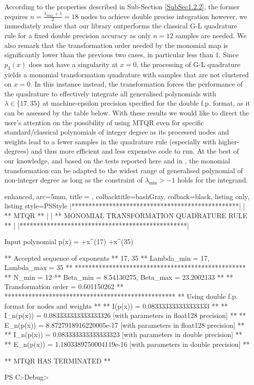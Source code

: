 \documentclass[a4paper, twosided]{book}
\begin{document}
\noindent
 According to the properties described in Sub-Section \ref{SubSec1.2.2}, the former requires $n=\frac{\lambda_{max}+1}{2}=18$ nodes to achieve double precise integration however, we immediately realise that our library outperforms the classical G-L quadrature rule for a fixed double precision accuracy as only $n=12$ samples are needed. We also remark  that the transformation order needed by the monomial map is significantly lower than the previous two cases, in particular less than $1$. Since $p_3(x)$ does not have a singularity at $x=0$, the processing of G-L quadrature yields a monomial transformation quadrature with samples that are not clustered on $x=0$. In this instance instead, the transformation forces the performance of the quadrature to effectively integrate all generalised polynomials with $\lambda\in\{17,35\}$ at machine-epsilon precision specified for the double f.p. format, as it can be assessed by the table below. With these results we would like to direct the user's attention on the possibility of using MTQR even for specific standard/classical polynomials of integer degree as its processed nodes and weights lead to a fewer samples in the quadrature rule (especially with higher-degrees) and thus more efficient and less expensive code to run. At the best of our knowledge, and based on the tests reported here and in \cite{Lombardi09, Lombardi21}, the monomial transformation can be adapted to the widest range of generalised polynomial of non-integer degree as long as the constraint of $\lambda_{\text{min}}>-1$ holds for the integrand.

\vspace{0.2cm}
\begin{tcblisting}{enhanced,
                   arc=5mm,
                   title = \color{black}{\large \ttfamily Executing the driver test case: p\_3(x)},
                   colbacktitle=bashGray,
                   colback=black,
                   listing only,
                   listing style=PSStyle}
    |*************************************************|
    |                 ** MTQR **                 |
    |  ** MONOMIAL TRANSFORMATION QUADRATURE RULE **  |
    |*************************************************|
    
Input polynomial p(x) =  +x^(17)  +x^(35) 

 ** Accepted sequence of exponents ** 
    {17, 35}
 ** Lambda_min = 17, Lambda_max = 35 **
 **************************************************
 ** N_min = 12
 ** Beta_min = 8.54130275, Beta_max = 23.2002133 **
 ** Transformation order = 0.601150262 **
 **************************************************
 ** Using double f.p. format for nodes and weights **
 ** I(p(x))   = 0.083333333333333333 **
 ** I_n(p(x)) = 0.083333333333333326    [with parameters in float128 precision] **
 ** E_n(p(x)) = 8.8727918916220005e-17  [with parameters in float128 precision] **
 ** I_n(p(x)) = 0.083333333333333323    [with parameters in double precision] **
 ** E_n(p(x)) = 1.1803389750004119e-16  [with parameters in double precision] **

 ** MTQR HAS TERMINATED **

PS C:\MTQR\out\build{}-Debug>
\end{tcblisting}
\vspace{0.3cm}
\end{document}
